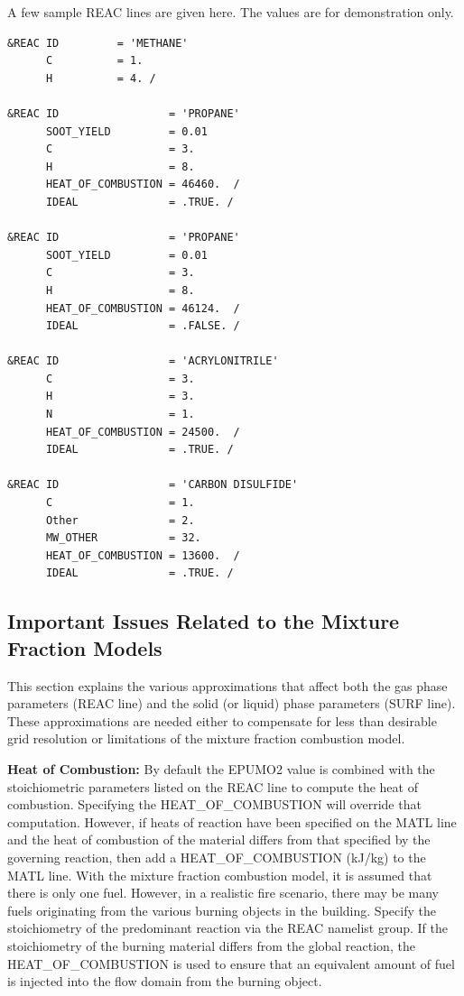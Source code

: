 \documentclass[11pt]{book}
\begin{document}
\noindent
A few sample {\ct REAC} lines are given here. The values are for demonstration only.


\footnotesize
\begin{verbatim}
&REAC ID         = 'METHANE'
      C          = 1.
      H          = 4. /

&REAC ID                 = 'PROPANE'
      SOOT_YIELD         = 0.01
      C                  = 3.
      H                  = 8.
      HEAT_OF_COMBUSTION = 46460.  /
      IDEAL              = .TRUE. /

&REAC ID                 = 'PROPANE'
      SOOT_YIELD         = 0.01
      C                  = 3.
      H                  = 8.
      HEAT_OF_COMBUSTION = 46124.  /
      IDEAL              = .FALSE. /

&REAC ID                 = 'ACRYLONITRILE'
      C                  = 3.
      H                  = 3.
      N                  = 1.
      HEAT_OF_COMBUSTION = 24500.  /
      IDEAL              = .TRUE. /

&REAC ID                 = 'CARBON DISULFIDE'
      C                  = 1.
      Other              = 2.
      MW_OTHER           = 32.
      HEAT_OF_COMBUSTION = 13600.  /
      IDEAL              = .TRUE. /
\end{verbatim}
\normalsize



\subsection{Important Issues Related to the Mixture Fraction Models}
\label{info:combustion}

This section explains the various approximations that
affect both the gas phase parameters ({\ct REAC} line) and the
solid (or liquid) phase parameters ({\ct SURF} line). These
approximations are needed either to compensate for less than
desirable grid resolution or limitations of the mixture fraction
combustion model.


\vspace{\baselineskip}
\noindent
{\bf Heat of Combustion:} By default the {\ct EPUMO2} value is combined with
the stoichiometric parameters listed
on the {\ct REAC} line to compute the heat of combustion.  Specifying the
{\ct HEAT\_OF\_COMBUSTION} will override that computation.
However, if heats of reaction have been specified on the
{\ct MATL} line and
the heat of combustion of the material differs from that specified by
the governing reaction, then add a
{\ct HEAT\_OF\_COMBUSTION} (kJ/kg) to the {\ct MATL} line.
With the mixture fraction combustion
model, it is assumed that there is only one fuel. However, in a realistic
fire scenario, there may be many fuels originating from the various
burning objects in the building. Specify
the stoichiometry of the predominant reaction via the {\ct REAC}
namelist group. If the stoichiometry of the burning material
differs from the global reaction, the {\ct HEAT\_OF\_COMBUSTION} is
used to ensure that an equivalent amount of fuel is injected into the
flow domain from the burning object.
\end{document}
